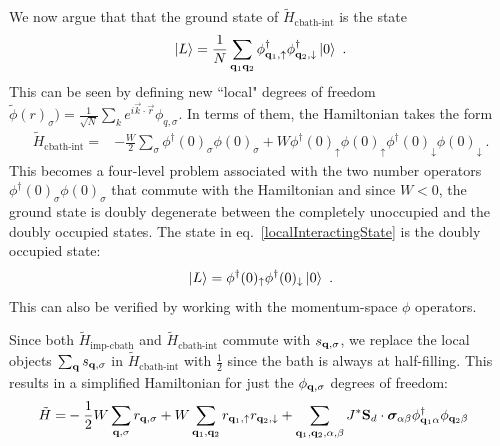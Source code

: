 We now argue that that the ground state of \(\tilde H_\text{cbath-int}\) is the state
\begin{equation}\begin{aligned}\label{localInteractingState}
	\ket{L} = \frac{1}{N}\sum_{{\bf q}_1{\bf q}_2}\phi^\dagger_{{\bf q}_1, \uparrow}\phi^\dagger_{{\bf q}_2, \downarrow} \ket{0}~.
\end{aligned}\end{equation}
This can be seen by defining new ``local" degrees of freedom \(\tilde\phi(r)_\sigma) = \frac{1}{\sqrt N}\sum_k e^{i \vec{k} \cdot \vec{r}} \phi_{q,\sigma}\). In terms of them, the Hamiltonian takes the form
\begin{equation}\begin{aligned}
	\tilde H_\text{cbath-int} =& -\frac{W}{2}\sum_{\sigma}\phi^\dagger(0)_{\sigma}\phi(0)_{\sigma} + W\phi^\dagger(0)_{\uparrow}\phi(0)_{\uparrow}\phi^\dagger(0)_{\downarrow}\phi(0)_{\downarrow}~.
\end{aligned}\end{equation}
This becomes a four-level problem associated with the two number operators \(\phi^\dagger(0)_{\sigma}\phi(0)_{\sigma}\) that commute with the Hamiltonian and since \(W < 0\), the ground state is doubly degenerate between the completely unoccupied and the doubly occupied states. The state in eq.~\ref{localInteractingState} is the doubly occupied state:
\begin{equation}\begin{aligned}
	\ket{L} = \phi^\dagger(0)_{\uparrow}\phi^\dagger(0)_{\downarrow} \ket{0}~.
\end{aligned}\end{equation}
This can also be verified by working with the momentum-space \(\phi\) operators. 

Since both \(\tilde H_\text{imp-cbath}\) and \(\tilde H_\text{cbath-int}\) commute with \(s_{{\bf q}, \sigma}\), we replace the local objects \(\sum_{\bf q}s_{{\bf q},\sigma}\) in \(\tilde H_\text{cbath-int}\) with \(\frac{1}{2}\) since the bath is always at half-filling. This results in a simplified Hamiltonian for just the \(\phi_{{\bf q},\sigma}\) degrees of freedom:
\begin{equation}\begin{aligned}
	\tilde H =& -\frac{1}{2}W\sum_{{\bf q},\sigma}r_{{\bf q},\sigma} + W\sum_{{\bf q}_1,{\bf q}_2}r_{{\bf q}_1,\uparrow} r_{{\bf q}_2,\downarrow} + \sum_{{\bf q}_1, {\bf q}_2,\alpha,\beta}J^*{\bf S}_d\cdot{\boldsymbol\sigma}_{\alpha\beta} {\phi}^\dagger_{{\bf q}_1\alpha} \phi_{{\bf q}_2\beta}
\end{aligned}\end{equation}

